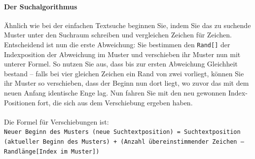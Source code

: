 \documentclass[11pt,a4paper]{scrartcl}
\begin{document}
\paragraph{Der Suchalgorithmus}
Ähnlich wie bei der einfachen Textsuche beginnen Sie, indem Sie das zu suchende Muster unter den Suchraum schreiben und vergleichen Zeichen für Zeichen. Entscheidend ist nun die erste Abweichung: Sie bestimmen den \texttt{Rand[]} der Indexposition der Abweichung im Muster und verschieben ihr Muster nun mit unterer Formel. So nutzen Sie aus, dass bis zur ersten Abweichung Gleichheit bestand -- falls bei vier gleichen Zeichen ein Rand von zwei vorliegt, können Sie ihr Muster so verschieben, dass der Beginn nun dort liegt, wo zuvor das mit dem neuen Anfang identische Enge lag. Nun fahren Sie mit den neu gewonnen Index-Positionen fort, die sich aus dem Verschiebung ergeben haben. \\\\
Die Formel für Verschiebungen ist: \\
\texttt{Neuer Beginn des Musters (neue Suchtextposition) = Suchtextposition (aktueller Beginn des Musters) + (Anzahl übereinstimmender Zeichen -- Randlänge[Index im Muster])}
\end{document}
